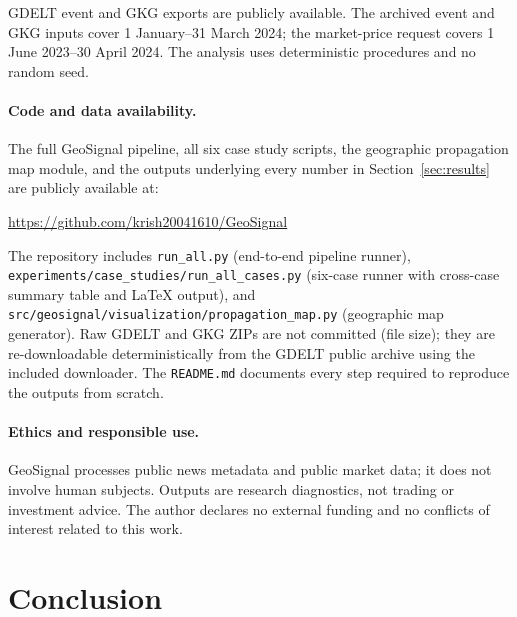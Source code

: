 \documentclass[10pt,a4paper,twocolumn]{article}
\begin{document}
GDELT event and GKG exports are publicly available. The archived event and GKG inputs cover 1 January--31 March 2024; the market-price request covers 1 June 2023--30 April 2024. The analysis uses deterministic procedures and no random seed.

\paragraph{Code and data availability.}
The full GeoSignal pipeline, all six case study scripts, the geographic propagation map module, and the outputs underlying every number in Section~\ref{sec:results} are publicly available at:

\begin{center}
\url{https://github.com/krish20041610/GeoSignal}
\end{center}

The repository includes \texttt{run\_all.py} (end-to-end pipeline runner), \texttt{experiments/case\_studies/run\_all\_cases.py} (six-case runner with cross-case summary table and LaTeX output), and \texttt{src/geosignal/visualization/propagation\_map.py} (geographic map generator). Raw GDELT and GKG ZIPs are not committed (file size); they are re-downloadable deterministically from the GDELT public archive using the included downloader. The \texttt{README.md} documents every step required to reproduce the outputs from scratch.

\paragraph{Ethics and responsible use.}
GeoSignal processes public news metadata and public market data; it does not involve human subjects. Outputs are research diagnostics, not trading or investment advice. The author declares no external funding and no conflicts of interest related to this work.

\section{Conclusion}\label{sec:conclusion}
\end{document}

